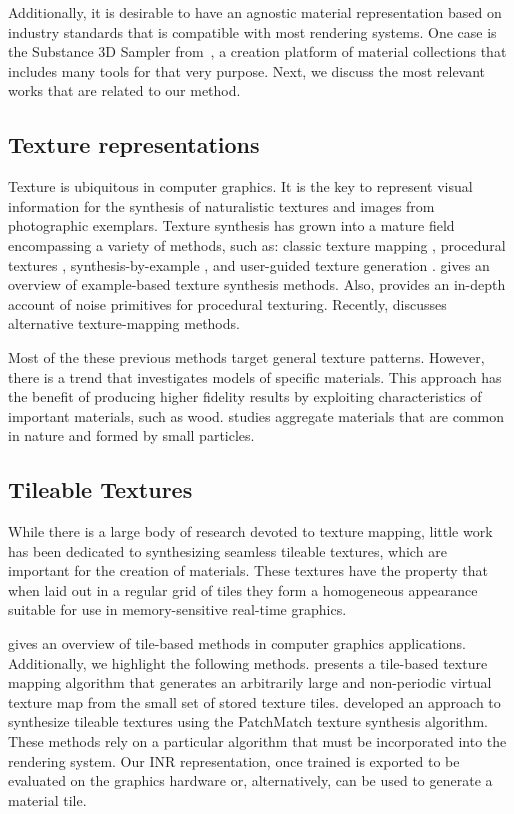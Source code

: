 Additionally, it is desirable to have an agnostic material representation based on industry standards that is compatible with most rendering systems. One case is the Substance 3D Sampler from~\citet{substance_sampler}, a creation platform of material collections that includes many tools for that very purpose. Next, we discuss the most relevant works that are related to our method.


\subsection{Texture representations}

Texture is ubiquitous in computer graphics. It is the key to represent visual information for the synthesis of naturalistic textures and images from photographic exemplars. Texture synthesis has grown into a mature field encompassing a variety of methods, such as: classic texture mapping \cite{blinn76}, procedural textures \cite{perlin-1985}, synthesis-by-example \cite{efros99}, and user-guided texture generation \cite{haeberli90}. \citet{pauly-2009} gives an overview of example-based texture synthesis methods. Also, \citet{etal-2010} provides an in-depth account of noise primitives for procedural texturing.
%
Recently, \citet{rethinkngtex} discusses alternative texture-mapping methods.

Most of the these previous methods target general texture patterns. However, there is a trend that investigates models of specific materials. This approach has the benefit of producing higher fidelity results by exploiting characteristics of important materials, such as wood.
\citet{dorsey-2004} studies aggregate materials that are common in nature and formed by small particles.

\subsection{Tileable Textures}

While there is a large body of research devoted to texture mapping, little work has been dedicated to synthesizing seamless tileable textures, which are important for the creation of materials. These textures have the property that when laid out in a regular grid of tiles they form a homogeneous appearance suitable for use in memory-sensitive real-time graphics.

\citet{tileinteractive} gives an overview of tile-based methods in computer graphics applications.
%
Additionally, we highlight the following methods. \citet{tilehard} presents a tile-based texture mapping algorithm that generates an arbitrarily large and non-periodic virtual texture map from the small set of stored texture tiles. \citet{Moritz2017Texture} developed an approach to synthesize tileable textures using the PatchMatch texture synthesis algorithm.
These methods rely on a particular algorithm that must be incorporated into the rendering system. Our INR representation, once trained is exported to be evaluated on the graphics hardware or, alternatively, can be used to generate a material tile.

